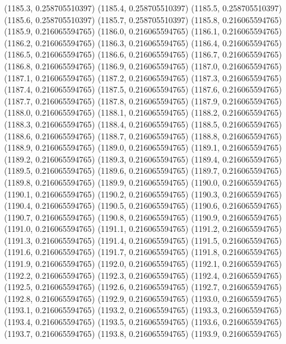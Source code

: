 {					(1185.3, 0.258705510397)
					(1185.4, 0.258705510397)
					(1185.5, 0.258705510397)
					(1185.6, 0.258705510397)
					(1185.7, 0.258705510397)
					(1185.8, 0.216065594765)
					(1185.9, 0.216065594765)
					(1186.0, 0.216065594765)
					(1186.1, 0.216065594765)
					(1186.2, 0.216065594765)
					(1186.3, 0.216065594765)
					(1186.4, 0.216065594765)
					(1186.5, 0.216065594765)
					(1186.6, 0.216065594765)
					(1186.7, 0.216065594765)
					(1186.8, 0.216065594765)
					(1186.9, 0.216065594765)
					(1187.0, 0.216065594765)
					(1187.1, 0.216065594765)
					(1187.2, 0.216065594765)
					(1187.3, 0.216065594765)
					(1187.4, 0.216065594765)
					(1187.5, 0.216065594765)
					(1187.6, 0.216065594765)
					(1187.7, 0.216065594765)
					(1187.8, 0.216065594765)
					(1187.9, 0.216065594765)
					(1188.0, 0.216065594765)
					(1188.1, 0.216065594765)
					(1188.2, 0.216065594765)
					(1188.3, 0.216065594765)
					(1188.4, 0.216065594765)
					(1188.5, 0.216065594765)
					(1188.6, 0.216065594765)
					(1188.7, 0.216065594765)
					(1188.8, 0.216065594765)
					(1188.9, 0.216065594765)
					(1189.0, 0.216065594765)
					(1189.1, 0.216065594765)
					(1189.2, 0.216065594765)
					(1189.3, 0.216065594765)
					(1189.4, 0.216065594765)
					(1189.5, 0.216065594765)
					(1189.6, 0.216065594765)
					(1189.7, 0.216065594765)
					(1189.8, 0.216065594765)
					(1189.9, 0.216065594765)
					(1190.0, 0.216065594765)
					(1190.1, 0.216065594765)
					(1190.2, 0.216065594765)
					(1190.3, 0.216065594765)
					(1190.4, 0.216065594765)
					(1190.5, 0.216065594765)
					(1190.6, 0.216065594765)
					(1190.7, 0.216065594765)
					(1190.8, 0.216065594765)
					(1190.9, 0.216065594765)
					(1191.0, 0.216065594765)
					(1191.1, 0.216065594765)
					(1191.2, 0.216065594765)
					(1191.3, 0.216065594765)
					(1191.4, 0.216065594765)
					(1191.5, 0.216065594765)
					(1191.6, 0.216065594765)
					(1191.7, 0.216065594765)
					(1191.8, 0.216065594765)
					(1191.9, 0.216065594765)
					(1192.0, 0.216065594765)
					(1192.1, 0.216065594765)
					(1192.2, 0.216065594765)
					(1192.3, 0.216065594765)
					(1192.4, 0.216065594765)
					(1192.5, 0.216065594765)
					(1192.6, 0.216065594765)
					(1192.7, 0.216065594765)
					(1192.8, 0.216065594765)
					(1192.9, 0.216065594765)
					(1193.0, 0.216065594765)
					(1193.1, 0.216065594765)
					(1193.2, 0.216065594765)
					(1193.3, 0.216065594765)
					(1193.4, 0.216065594765)
					(1193.5, 0.216065594765)
					(1193.6, 0.216065594765)
					(1193.7, 0.216065594765)
					(1193.8, 0.216065594765)
					(1193.9, 0.216065594765)
}
